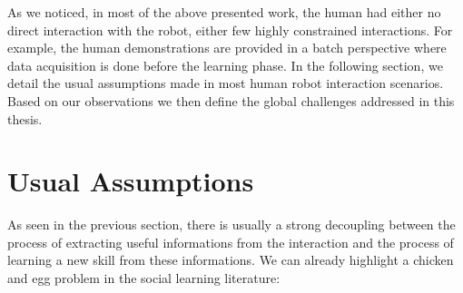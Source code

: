 As we noticed, in most of the above presented work, the human had either no direct interaction with the robot, either few highly constrained interactions. For example, the human demonstrations are provided in a batch perspective where data acquisition is done before the learning phase. In the following section, we detail the usual assumptions made in most human robot interaction scenarios.  Based on our observations we then define the global challenges addressed in this thesis.

\section{Usual Assumptions}


As seen in the previous section, there is usually a strong decoupling between the process of extracting useful informations from the interaction and the process of learning a new skill from these informations. We can already highlight a chicken and egg problem in the social learning literature:

